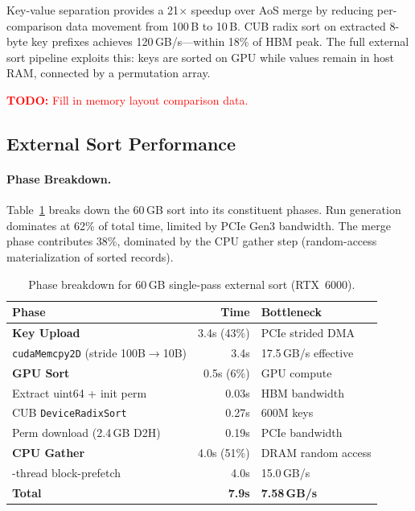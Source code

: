 \documentclass[conference,10pt]{IEEEtran}
\newcommand{\todo}[1]{\textcolor{red}{\textbf{TODO:} #1}}
\begin{document}
Key-value separation provides a 21$\times$ speedup over AoS merge by reducing
per-comparison data movement from 100\,B to 10\,B.  CUB radix sort on
extracted 8-byte key prefixes achieves 120\,GB/s---within 18\% of HBM peak.
The full external sort pipeline exploits this: keys are sorted on GPU while
values remain in host RAM, connected by a permutation array.

\todo{Fill in memory layout comparison data.}

\subsection{External Sort Performance}

\paragraph{Phase Breakdown.}
Table~\ref{tab:phase_breakdown} breaks down the 60\,GB sort into its
constituent phases.  Run generation dominates at 62\% of total time,
limited by PCIe Gen3 bandwidth.  The merge phase contributes 38\%,
dominated by the CPU gather step (random-access materialization of
sorted records).

\begin{table}[t]
  \centering
  \caption{Phase breakdown for 60\,GB single-pass external sort (RTX~6000).}
  \label{tab:phase_breakdown}
  \begin{tabular}{@{}lrl@{}}
    \toprule
    Phase & Time & Bottleneck \\
    \midrule
    \textbf{Key Upload} & 3.4s (43\%) & PCIe strided DMA \\
    \quad \texttt{cudaMemcpy2D} (stride 100B$\to$10B) & 3.4s & 17.5\,GB/s effective \\
    \midrule
    \textbf{GPU Sort} & 0.5s (6\%) & GPU compute \\
    \quad Extract uint64 + init perm & 0.03s & HBM bandwidth \\
    \quad CUB \texttt{DeviceRadixSort} & 0.27s & 600M keys \\
    \quad Perm download (2.4\,GB D2H) & 0.19s & PCIe bandwidth \\
    \midrule
    \textbf{CPU Gather} & 4.0s (51\%) & DRAM random access \\
    \quad 48-thread block-prefetch & 4.0s & 15.0\,GB/s \\
    \midrule
    \textbf{Total} & \textbf{7.9s} & \textbf{7.58\,GB/s} \\
    \bottomrule
  \end{tabular}
\end{table}
\end{document}
